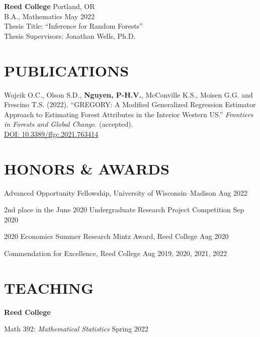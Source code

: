 \documentclass[margin]{res}
\def\pvn{\textbf{Nguyen, P-H.V.}}
\begin{document}
\begin{resume}
                {\bf Reed College} \hfill Portland, OR \\
                B.A., Mathematics \hfill May 2022 \\
                Thesis Title: ``Inference for Random Forests'' \\
                Thesis Supervisors: Jonathan Wells, Ph.D.
  
  


\section{PUBLICATIONS}

Wojcik O.C., Olson S.D., \pvn, McConville K.S., Moisen G.G. and Frescino T.S. (2022). ``GREGORY: A Modified Generalized Regression Estimator Approach to Estimating Forest Attributes in the Interior Western US.'' \textit{Frontiers in Forests and Global Change}. (accepted). \\ \href{https://doi.org/10.3389/ffgc.2021.763414}{DOI: 10.3389/ffgc.2021.763414}



\section{HONORS \& AWARDS} 

Advanced Opportunity Fellowship, University of Wisconsin--Madison \hfill Aug 2022

2nd place in the June 2020 Undergraduate Research Project Competition \hfill Sep 2020

2020 Economics Summer Research Mintz Award, Reed College \hfill Aug 2020

Commendation for Excellence, Reed College \hfill Aug 2019, 2020, 2021, 2022

\section{TEACHING}

\textbf{Reed College} 

Math 392: {\it Mathematical Statistics} \hfill Spring 2022


\end{resume}
\end{document}
